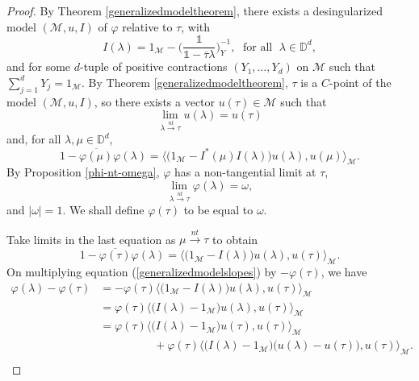 \documentclass[11pt, reqno]{amsart}
\newcommand\1{\boldsymbol {1}}
\newcommand{\D}{\mathbb{D}}
\newcommand{\ph}{\varphi}
\numberwithin{equation}{section}
\begin{document}
\begin{proof}
By Theorem \ref{generalizedmodeltheorem}, there exists a desingularized model $(\mathcal{M},u,I)$ of $\varphi$ relative to $\tau$, with
$$I(\lambda)=1_{\mathcal{M}}-\bigg(\dfrac{\mathds{1}}{\mathds{1}-\overline{\tau}\lambda}\bigg)^{-1}_{Y}, \; \text{ for all } \; \lambda \in \D^d,$$
and for some $d$-tuple of positive contractions $(Y_{1},\hdots,Y_{d})$ on $\mathcal{M}$ such that $\sum_{j=1}^{d}Y_{j}=1_{\mathcal{M}}.$
By Theorem \ref{generalizedmodeltheorem}, $\tau$ is a $C$-point of the model $(\mathcal{M},u,I)$, so there exists a vector $u(\tau)\in\mathcal{M}$ such that
\begin{equation}\label{cpointulambda}
\lim_{\lambda{\overset{nt}\rightarrow}\tau}u(\lambda)=u(\tau)
\end{equation}
and, for all $\lambda,\mu\in\mathbb{D}^{d}$, 
\begin{equation}\label{modelequationinthisproof-1}
    1-\overline{\varphi(\mu)}\varphi(\lambda) = \bigg\langle \Big(1_{\mathcal{M}}-I^{*}(\mu)I(\lambda)\Big)u(\lambda),u(\mu)\bigg\rangle_{\mathcal{M}}.
\end{equation}
By Proposition  \ref{phi-nt-omega},   $\ph$ has a non-tangential limit at $\tau$,
$$ \lim_{\lambda{\overset{nt}\rightarrow}\tau}\varphi(\lambda)=\omega,$$
and  $|\omega|=1$. We shall define $\varphi(\tau)$ to be equal to $ \omega$.

Take limits in the last equation as ${\mu{\overset{nt}\rightarrow}\tau}$ to obtain
\begin{equation}\label{generalizedmodelslopes}
    1-\overline{\varphi(\tau)}\varphi(\lambda)=\bigg\langle\Big( 1_{\mathcal{M}}-I(\lambda)\Big)u(\lambda),u(\tau)\bigg\rangle_{\mathcal{M}}.
\end{equation}
On multiplying equation (\ref{generalizedmodelslopes}) by $-\varphi(\tau)$, we have 
\begin{align}
   \varphi(\lambda)-\varphi(\tau)&=-\varphi(\tau)\bigg\langle\Big( 1_{\mathcal{M}}-I(\lambda)\Big)u(\lambda),u(\tau)\bigg\rangle_{\mathcal{M}}\nonumber\\
&=\varphi(\tau)\bigg\langle\Big(I(\lambda)-1_{\mathcal{M}}\Big)u(\lambda),u(\tau)\bigg\rangle_{\mathcal{M}}\nonumber\\
&=\varphi(\tau)\bigg\langle\Big(I(\lambda)-1_{\mathcal{M}}\Big)u(\tau),u(\tau)\bigg\rangle_{\mathcal{M}}\nonumber\\
&\hspace{2cm}+\varphi(\tau)\bigg\langle\Big(I(\lambda)-1_{\mathcal{M}}\Big)\big(u(\lambda)-u(\tau)\big),u(\tau)\bigg\rangle_{\mathcal{M}}.\label{lastequationontheleft}\\\nonumber
\end{align}


\end{proof}
\end{document}
